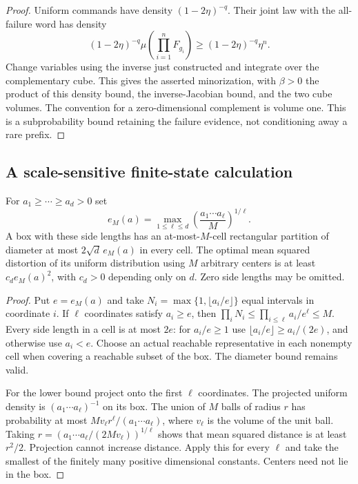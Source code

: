 \begin{proof}
Uniform commands have density $(1-2\eta)^{-q}$. Their joint law with the
all-failure word has density
\[
 (1-2\eta)^{-q}\mu\!\left(\prod_{i=1}^nF_{g_i}\right)
       \ge (1-2\eta)^{-q}\eta^n.
\]
Change variables using the inverse just constructed and integrate over
the complementary cube. This gives the asserted minorization, with
$\beta>0$ the product of this density bound, the inverse-Jacobian bound,
and the two cube volumes. The convention for a zero-dimensional
complement is volume one. This is a subprobability bound retaining the
failure evidence, not conditioning away a rare prefix.
\end{proof}

\subsection{A scale-sensitive finite-state calculation}
\begin{lemma}\label{lem:rectangle}
For $a_1\ge\cdots\ge a_d>0$ set
\[
 e_M(a)=\max_{1\le\ell\le d}
                  \left(\frac{a_1\cdots a_\ell}{M}\right)^{1/\ell}.
\]
A box with these side lengths has an at-most-$M$-cell rectangular
partition of diameter at most $2\sqrt d\,e_M(a)$ in every cell.
The optimal mean squared distortion of its uniform distribution using
$M$ arbitrary centers is at least $c_d e_M(a)^2$, with $c_d>0$
depending only on $d$. Zero side lengths may be omitted.
\end{lemma}
\begin{proof}
Put $e=e_M(a)$ and take $N_i=\max\{1,\lfloor a_i/e\rfloor\}$
equal intervals in coordinate $i$. If $\ell$ coordinates satisfy
$a_i\ge e$, then
$\prod_iN_i\le\prod_{i\le\ell}a_i/e^\ell\le M$.
Every side length in a cell is at most $2e$: for $a_i/e\ge1$ use
$\lfloor a_i/e\rfloor\ge a_i/(2e)$, and otherwise use $a_i<e$.
Choose an actual reachable representative in each nonempty cell when
covering a reachable subset of the box. The diameter bound remains valid.

For the lower bound project onto the first $\ell$ coordinates. The
projected uniform density is $(a_1\cdots a_\ell)^{-1}$ on its box.
The union of $M$ balls of radius $r$ has probability at most
$M v_\ell r^\ell/(a_1\cdots a_\ell)$, where $v_\ell$ is the volume of
the unit ball. Taking
$r=(a_1\cdots a_\ell/(2Mv_\ell))^{1/\ell}$ shows that mean squared
distance is at least $r^2/2$. Projection cannot increase distance.
Apply this for every $\ell$ and take the smallest of the finitely many
positive dimensional constants. Centers need not lie in the box.
\end{proof}

